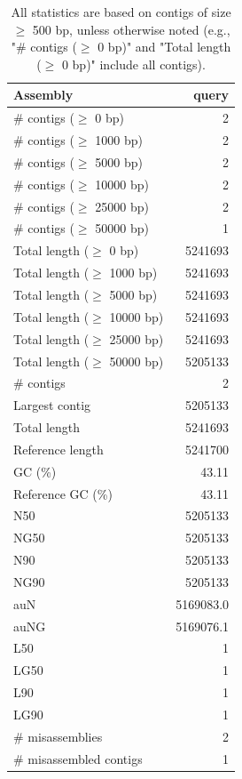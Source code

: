 \documentclass[12pt,a4paper]{article}
\begin{document}
\begin{table}[ht]
\begin{center}
\caption{All statistics are based on contigs of size $\geq$ 500 bp, unless otherwise noted (e.g., "\# contigs ($\geq$ 0 bp)" and "Total length ($\geq$ 0 bp)" include all contigs).}
\begin{tabular}{|l*{1}{|r}|}
\hline
Assembly & query \\ \hline
\# contigs ($\geq$ 0 bp) & 2 \\ \hline
\# contigs ($\geq$ 1000 bp) & 2 \\ \hline
\# contigs ($\geq$ 5000 bp) & 2 \\ \hline
\# contigs ($\geq$ 10000 bp) & 2 \\ \hline
\# contigs ($\geq$ 25000 bp) & 2 \\ \hline
\# contigs ($\geq$ 50000 bp) & 1 \\ \hline
Total length ($\geq$ 0 bp) & 5241693 \\ \hline
Total length ($\geq$ 1000 bp) & 5241693 \\ \hline
Total length ($\geq$ 5000 bp) & 5241693 \\ \hline
Total length ($\geq$ 10000 bp) & 5241693 \\ \hline
Total length ($\geq$ 25000 bp) & 5241693 \\ \hline
Total length ($\geq$ 50000 bp) & 5205133 \\ \hline
\# contigs & 2 \\ \hline
Largest contig & 5205133 \\ \hline
Total length & 5241693 \\ \hline
Reference length & 5241700 \\ \hline
GC (\%) & 43.11 \\ \hline
Reference GC (\%) & 43.11 \\ \hline
N50 & 5205133 \\ \hline
NG50 & 5205133 \\ \hline
N90 & 5205133 \\ \hline
NG90 & 5205133 \\ \hline
auN & 5169083.0 \\ \hline
auNG & 5169076.1 \\ \hline
L50 & 1 \\ \hline
LG50 & 1 \\ \hline
L90 & 1 \\ \hline
LG90 & 1 \\ \hline
\# misassemblies & 2 \\ \hline
\# misassembled contigs & 1 \\ \hline

\end{tabular}
\end{center}
\end{table}
\end{document}
